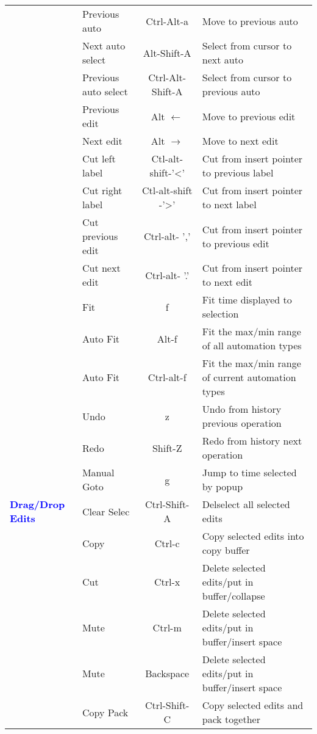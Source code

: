 \begin{center}
\begin{longtable}{ >{\bfseries}p{2cm} l c p{6cm}}
        & Previous auto & Ctrl-Alt-a & Move to previous auto\\        
        & Next auto select & Alt-Shift-A & Select from cursor to next auto \\        
        & Previous auto select & Ctrl-Alt-Shift-A & Select from cursor to previous auto \\        
        & Previous edit & Alt $\leftarrow$ & Move to previous edit \\        
        & Next edit & Alt $\rightarrow$ & Move to next edit \\        
        & Cut left label & Ctl-alt-shift-'<' & Cut from insert pointer to previous label \\        
        & Cut right label & Ctl-alt-shift -'>' & Cut from insert pointer to next label \\        
        & Cut previous edit & Ctrl-alt- ',' & Cut from insert pointer to previous edit \\        
        & Cut next edit & Ctrl-alt- '.' & Cut from insert pointer to next edit \\        
        & Fit & f & Fit time displayed to selection \\        
        & Auto Fit & Alt-f & Fit the max/min range of all automation types \\        
        & Auto Fit & Ctrl-alt-f & Fit the max/min range of current automation types \\        
        & Undo & z & Undo from history previous operation \\        
        & Redo & Shift-Z & Redo from history next operation \\        
        & Manual Goto & g & Jump to time selected by popup \\
        \midrule
        \textcolor{blue}{Drag/Drop Edits} & Clear Selec & Ctrl-Shift-A & Delselect all selected edits \\        
        & Copy & Ctrl-c & Copy selected edits into copy buffer \\        
        & Cut & Ctrl-x & Delete selected edits/put in buffer/collapse \\        
        & Mute & Ctrl-m & Delete selected edits/put in buffer/insert space \\        
        & Mute & Backspace & Delete selected edits/put in buffer/insert space \\        
        & Copy Pack & Ctrl-Shift-C & Copy selected edits and pack together \\        

\end{longtable}
\end{center}
